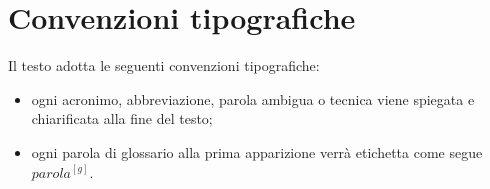\section{Convenzioni tipografiche}
Il testo adotta le seguenti convenzioni tipografiche:
\begin{itemize}
	\item ogni acronimo, abbreviazione, parola ambigua o tecnica viene spiegata e chiarificata alla fine del testo;
	\item ogni parola di glossario alla prima apparizione verrà etichetta come segue $parola^{[g]}$.
\end{itemize}


































